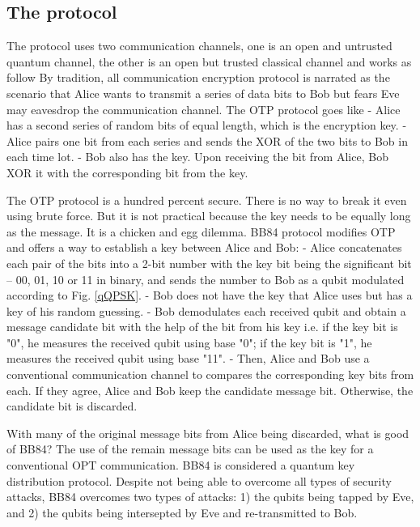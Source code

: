 \documentclass{book}
\begin{document}
\subsection{The protocol}
The protocol uses two communication channels, one is an open and untrusted quantum channel, the other is an open but trusted classical channel and works as follow
By tradition, all communication encryption protocol is narrated as the scenario that Alice wants to transmit a series of data bits to Bob but fears Eve may eavesdrop the communication channel\cite{Schneier}. The OTP protocol goes like
- Alice has a second series of random bits of equal length, which is the encryption key.
- Alice pairs one bit from each series and sends the XOR of the two bits to Bob in each time lot.
- Bob also has the key. Upon receiving the bit from Alice, Bob XOR it with the corresponding bit from the key.

The OTP protocol is a hundred percent secure. There is no way to break it even using brute force. But it is not practical because the key needs to be equally long as the message. It is a chicken and egg dilemma. BB84 protocol modifies OTP and offers a way to establish a key between Alice and Bob:
- Alice concatenates each pair of the bits into a 2-bit number with the key bit being the significant bit -- 00, 01, 10 or 11 in binary, and sends the number to Bob as a qubit modulated according to Fig. \ref{qQPSK}.
- Bob does not have the key that Alice uses but has a key of his random guessing.
- Bob demodulates each received qubit and obtain a message candidate bit with the help of the bit from his key i.e. if the key bit is "0", he measures the received qubit using base "0"; if the key bit is "1", he measures the received qubit using base "11".
- Then, Alice and Bob use a conventional communication channel to compares the corresponding key bits from each. If they agree, Alice and Bob keep the candidate message bit. Otherwise, the candidate bit is discarded.

With many of the original message bits from Alice being discarded, what is good of BB84? The use of the remain message bits can be used as the key for a conventional OPT communication. BB84 is considered a quantum key distribution protocol. Despite not being able to overcome all types of security attacks, BB84 overcomes two types of attacks: 1) the qubits being tapped by Eve, and 2) the qubits being intersepted by Eve and re-transmitted to Bob.
\end{document}

